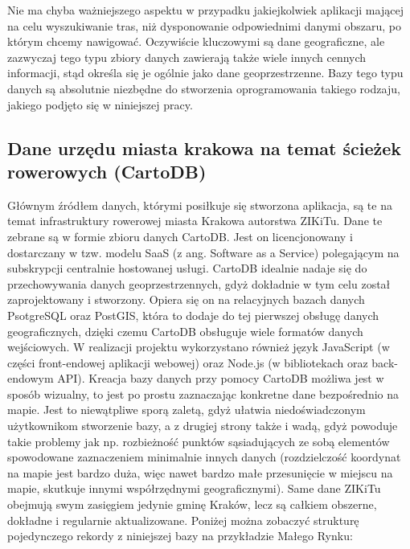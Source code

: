 Nie ma chyba ważniejszego aspektu w przypadku jakiejkolwiek aplikacji mającej na celu wyszukiwanie tras, niż dysponowanie odpowiednimi danymi obszaru, po którym chcemy nawigować. Oczywiście kluczowymi są dane geograficzne, ale zazwyczaj tego typu zbiory danych zawierają także wiele innych cennych informacji, stąd określa się je ogólnie jako dane geoprzestrzenne. Bazy tego typu danych są absolutnie niezbędne do stworzenia oprogramowania takiego rodzaju, jakiego podjęto się w niniejszej pracy.


\subsection{Dane urzędu miasta krakowa na temat ścieżek rowerowych (CartoDB)}

Głównym źródłem danych, którymi posiłkuje się stworzona aplikacja, są te na temat infrastruktury rowerowej miasta Krakowa autorstwa ZIKiTu. Dane te zebrane są w formie zbioru danych CartoDB. Jest on licencjonowany i dostarczany w tzw. modelu SaaS (z ang. Software as a Service) polegającym na subskrypcji centralnie hostowanej usługi. CartoDB idealnie nadaje się do przechowywania danych geoprzestrzennych, gdyż dokładnie w tym celu został zaprojektowany i stworzony. Opiera się on na relacyjnych bazach danych PsotgreSQL oraz PostGIS, która to dodaje do tej pierwszej obsługę danych geograficznych, dzięki czemu CartoDB obsługuje wiele formatów danych wejściowych. W realizacji projektu wykorzystano również język JavaScript (w części front-endowej aplikacji webowej) oraz Node.js (w bibliotekach oraz back-endowym API). Kreacja bazy danych przy pomocy CartoDB możliwa jest w sposób wizualny, to jest po prostu zaznaczając konkretne dane bezpośrednio na mapie. Jest to niewątpliwe sporą zaletą, gdyż ułatwia niedoświadczonym użytkownikom stworzenie bazy, a z drugiej strony także i wadą, gdyż powoduje takie problemy jak np. rozbieżność punktów sąsiadujących ze sobą elementów spowodowane zaznaczeniem minimalnie innych danych (rozdzielczość koordynat na mapie jest bardzo duża, więc nawet bardzo małe przesunięcie w miejscu na mapie, skutkuje innymi współrzędnymi geograficznymi).\newline
Same dane ZIKiTu obejmują swym zasięgiem jedynie gminę Kraków, lecz są całkiem obszerne, dokładne i regularnie aktualizowane. Poniżej można zobaczyć strukturę pojedynczego rekordy z niniejszej bazy na przykładzie Małego Rynku: \newline


